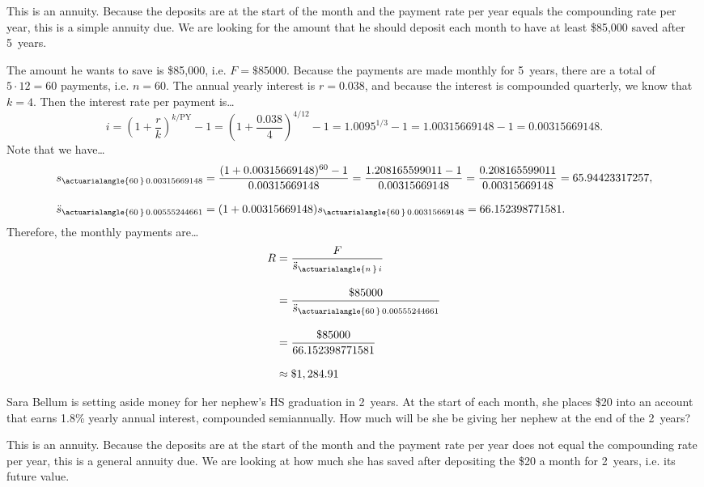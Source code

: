 \documentclass[11pt,letterpaper]{article}
\begin{document}
\sol This is an annuity. Because the deposits are at the start of the month and the payment rate per year equals the compounding rate per year, this is a simple annuity due. We are looking for the amount that he should deposit each month to have at least \$85,000 saved after 5~years. \pspace

The amount he wants to save is \$85,000, i.e. $F= \$85000$. Because the payments are made monthly for 5~years, there are a total of $5 \cdot 12= 60$ payments, i.e. $n= 60$. The annual yearly interest is $r= 0.038$, and because the interest is compounded quarterly, we know that $k= 4$. Then the interest rate per payment is\dots
	\[
	i= \left( 1 + \dfrac{r}{k} \right)^{k/\text{PY}} - 1= \left( 1 + \dfrac{0.038}{4} \right)^{4/12} - 1= 1.0095^{1/3} - 1= 1.00315669148 - 1= 0.00315669148.
	\] \pspace
Note that we have\dots 
	\[
	\begin{aligned}
	s_{\actuarialangle{60\,}\, 0.00315669148}&= \dfrac{(1 + 0.00315669148)^{60} - 1}{0.00315669148}= \dfrac{1.208165599011 - 1}{0.00315669148}= \dfrac{0.208165599011}{0.00315669148}= 65.94423317257, \\[0.3cm]
	\ddot{s}_{\actuarialangle{60\,}\, 0.00555244661}&= (1 + 0.00315669148) s_{\actuarialangle{60\,}\, 0.00315669148}= 66.152398771581.
	\end{aligned}
	\] \pspace
Therefore, the monthly payments are\dots
	\[
	\begin{aligned}
	R&= \dfrac{F}{\ddot{s}_{\actuarialangle{n\,}\, i}} \\[0.3cm]
	&= \dfrac{\$85000}{\ddot{s}_{\actuarialangle{60\,}\, 0.00555244661}} \\[0.3cm]
	&= \dfrac{\$85000}{66.152398771581} \\[0.3cm]
	&\approx \$1,284.91
	\end{aligned}
	\]



\newpage



 Sara Bellum is setting aside money for her nephew's HS graduation in 2~years. At the start of each month, she places \$20 into an account that earns 1.8\% yearly annual interest, compounded semiannually. How much will be she be giving her nephew at the end of the 2~years? \pspace

\sol This is an annuity. Because the deposits are at the start of the month and the payment rate per year does not equal the compounding rate per year, this is a general annuity due. We are looking at how much she has saved after depositing the \$20 a month for 2~years, i.e. its future value. \pspace
\end{document}
